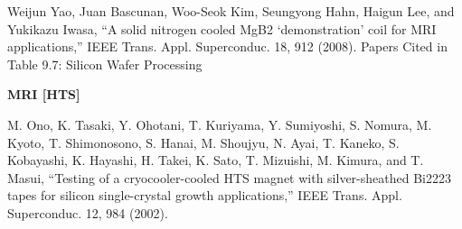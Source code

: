 \noindent [9.385] Weijun Yao, Juan Bascunan, Woo-Seok Kim, Seungyong Hahn, Haigun Lee, and
Yukikazu Iwasa, ``A solid nitrogen cooled MgB2 ‘demonstration’ coil for MRI
applications,” IEEE Trans. Appl. Superconduc. 18, 912 (2008).
Papers Cited in Table 9.7: Silicon Wafer Processing 

\noindent \textbf{MRI [HTS]}

\noindent [9.386] M. Ono, K. Tasaki, Y. Ohotani, T. Kuriyama, Y. Sumiyoshi, S. Nomura, M. Kyoto,
T. Shimonosono, S. Hanai, M. Shoujyu, N. Ayai, T. Kaneko, S. Kobayashi,
K. Hayashi, H. Takei, K. Sato, T. Mizuishi, M. Kimura, and T. Masui, ``Testing
of a cryocooler-cooled HTS magnet with silver-sheathed Bi2223 tapes for silicon
single-crystal growth applications,” IEEE Trans. Appl. Superconduc. 12, 984
(2002).
